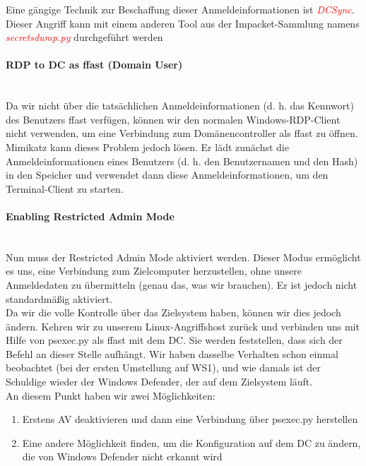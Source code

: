 Eine gängige Technik zur Beschaffung dieser Anmeldeinformationen ist \textcolor{red}{\textit{DCSync}}.\\
Dieser Angriff kann mit einem anderen Tool aus der Impacket-Sammlung namens \textcolor{red}{\textit{secretsdump.py}} durchgeführt werden

\paragraph{RDP to DC as ffast (Domain User)}\mbox{} \\
Da wir nicht über die tatsächlichen Anmeldeinformationen (d. h. das Kennwort) des Benutzers ffast verfügen, können wir den normalen Windows-RDP-Client nicht verwenden, um eine Verbindung zum Domänencontroller als ffast zu öffnen.\\

Mimikatz kann dieses Problem jedoch lösen. Er lädt zunächst die Anmeldeinformationen eines Benutzers (d. h. den Benutzernamen und den Hash) in den Speicher und verwendet dann diese Anmeldeinformationen, um den Terminal-Client zu starten.

\paragraph{Enabling Restricted Admin Mode}\mbox{} \\
Nun muss der Restricted Admin Mode aktiviert werden. Dieser Modus ermöglicht es uns, eine Verbindung zum Zielcomputer herzustellen, ohne unsere Anmeldedaten zu übermitteln (genau das, was wir brauchen). Er ist jedoch nicht standardmäßig aktiviert.\\
Da wir die volle Kontrolle über das Zielsystem haben, können wir dies jedoch ändern. Kehren wir zu unserem Linux-Angriffshost zurück und verbinden uns mit Hilfe von psexec.py als ffast mit dem DC.
Sie werden feststellen, dass sich der Befehl an dieser Stelle aufhängt. Wir haben dasselbe Verhalten schon einmal beobachtet (bei der ersten Umstellung auf WS1), und wie damals ist der Schuldige wieder der Windows Defender, der auf dem Zielsystem läuft.\\

An diesem Punkt haben wir zwei Möglichkeiten:\\
\begin{enumerate}
    \item Erstens AV deaktivieren und dann eine Verbindung über psexec.py herstellen
    \item Eine andere Möglichkeit finden, um die Konfiguration auf dem DC zu ändern, die von Windows Defender nicht erkannt wird\\
\end{enumerate}

